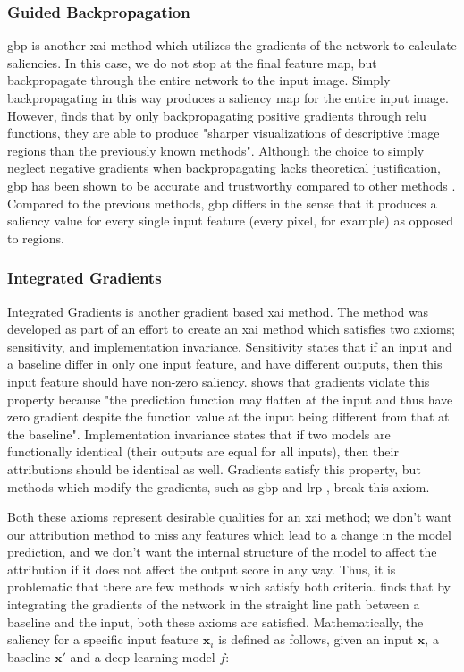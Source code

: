 \documentclass[UKenglish]{uiomasterthesis} %
\theoremstyle{definition}
\begin{document}
\subsubsection{Guided Backpropagation} \label{section:guidebackpropagation}

\ac{gbp} \cite{gbp} is another \ac{xai} method which utilizes the gradients of the network to calculate saliencies. In this case, we do not stop at the final feature map, but backpropagate through the entire network to the input image. Simply backpropagating in this way produces a saliency map for the entire input image. However, \cite{gbp} finds that by only backpropagating positive gradients through \acs{relu} functions, they are able to produce "sharper visualizations of descriptive image regions than the previously known methods". Although the choice to simply neglect negative gradients when backpropagating lacks theoretical justification, \ac{gbp} has been shown to be accurate and trustworthy compared to other methods \cite{arras2022clevr, pianpanit2021parkinson}. Compared to the previous methods, \ac{gbp} differs in the sense that it produces a saliency value for every single input feature (every pixel, for example) as opposed to regions.

\subsubsection{Integrated Gradients} \label{section:integratedgradients}

Integrated Gradients \cite{integratedgradients} is another gradient based \ac{xai} method. The method was developed as part of an effort to create an \ac{xai} method which satisfies two axioms; sensitivity, and implementation invariance. Sensitivity states that if an input and a baseline differ in only one input feature, and have different outputs, then this input feature should have non-zero saliency. \cite{integratedgradients} shows that gradients violate this property because "the prediction function may flatten at the input and thus have zero gradient despite the function value at the input being different from that at the baseline". Implementation invariance states that if two models are functionally identical (their outputs are equal for all inputs), then their attributions should be identical as well. Gradients satisfy this property, but methods which modify the gradients, such as \ac{gbp} and \ac{lrp} \cite{lrp}, break this axiom.

Both these axioms represent desirable qualities for an \ac{xai} method; we don't want our attribution method to miss any features which lead to a change in the model prediction, and we don't want the internal structure of the model to affect the attribution if it does not affect the output score in any way. Thus, it is problematic that there are few methods which satisfy both criteria. \cite{integratedgradients} finds that by integrating the gradients of the network in the straight line path between a baseline and the input, both these axioms are satisfied. Mathematically, the saliency for a specific input feature $\mathbf{x}_i$ is defined as follows, given an input $\mathbf{x}$, a baseline $\mathbf{x'}$ and a deep learning model $f$:
\end{document}
